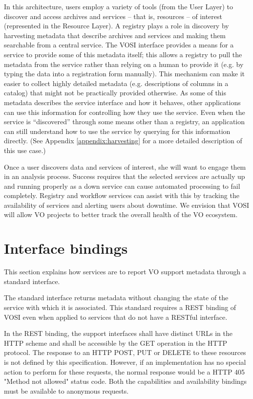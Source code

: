 \documentclass[11pt,letter]{ivoa}
\begin{document}
In this architecture, users employ a variety of tools (from the User
Layer) to discover and access archives and services -- that is,
resources -- of interest (represented in the Resource Layer). A registry
plays a role in discovery by harvesting metadata that describe archives
and services and making them searchable from a central service. The VOSI
interface provides a means for a service to provide some of this
metadata itself; this allows a registry to pull the metadata from the
service rather than relying on a human to provide it (e.g. by typing the
data into a registration form manually). This mechanism can make it
easier to collect highly detailed metadata (e.g. descriptions of columns
in a catalog) that might not be practically provided otherwise. As some
of this metadata describes the service interface and how it behaves,
other applications can use this information for controlling how they use
the service. Even when the service is ``discovered'' through some means other than a registry, an application can still understand how to use the service by querying for this information directly. (See Appendix \ref{appendix:harvesting} for a more detailed description of this use case.)

Once a user discovers data and services of interest, she will want to engage them in an analysis process. Success requires that the selected services are actually up and running properly as a down service can cause automated processing to fail completely. Registry and workflow services can assist with this by tracking the availability of services and alerting users about downtime. We envision that VOSI will allow VO projects to better track the overall health of the VO ecosystem. 

\section{Interface bindings}
\label{sec:bindings}

This section explains how services are to report VO support metadata through a standard interface.

The standard interface returns metadata without changing the state of the service with which it is associated. This standard requires a REST binding of VOSI even when applied to services that do not have a RESTful interface.

In the REST binding, the support interfaces shall have distinct URLs in the HTTP scheme and shall be accessible by the GET operation in the HTTP protocol. The response to an HTTP POST, PUT or DELETE to these resources is not defined by this specification. However, if an implementation has no special action to perform for these requests, the normal response would be a HTTP 405 "Method not allowed" status code.  Both the capabilities and availability bindings must be available to anonymous requests.
\end{document}
